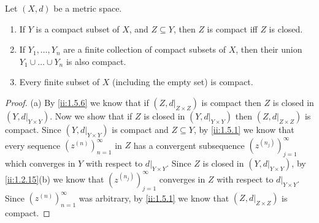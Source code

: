 \begin{thm}\label{ii:1.5.10}
  Let \((X, d)\) be a metric space.
  \begin{enumerate}
    \item If \(Y\) is a compact subset of \(X\), and \(Z \subseteq Y\), then \(Z\) is compact iff \(Z\) is closed.
    \item If \(Y_1, \dots, Y_n\) are a finite collection of compact subsets of \(X\), then their union \(Y_1 \cup \dots \cup Y_n\) is also compact.
    \item Every finite subset of \(X\) (including the empty set) is compact.
  \end{enumerate}
\end{thm}

\begin{proof}{(a)}
  By \cref{ii:1.5.6} we know that if \((Z, d|_{Z \times Z})\) is compact then \(Z\) is closed in \((Y, d|_{Y \times Y})\).
  Now we show that if \(Z\) is closed in \((Y, d|_{Y \times Y})\) then \((Z, d|_{Z \times Z})\) is compact.
  Since \((Y, d|_{Y \times Y})\) is compact and \(Z \subseteq Y\), by \cref{ii:1.5.1} we know that every sequence \((z^{(n)})_{n = 1}^\infty\) in \(Z\) has a convergent subsequence \((z^{(n_j)})_{j = 1}^\infty\) which converges in \(Y\) with respect to \(d|_{Y \times Y}\).
  Since \(Z\) is closed in \((Y, d|_{Y \times Y})\), by \cref{ii:1.2.15}(b) we know that \((z^{(n_j)})_{j = 1}^\infty\) converges in \(Z\) with respect to \(d|_{Y \times Y}\).
  Since \((z^{(n)})_{n = 1}^\infty\) was arbitrary, by \cref{ii:1.5.1} we know that \((Z, d|_{Z \times Z})\) is compact.
\end{proof}

